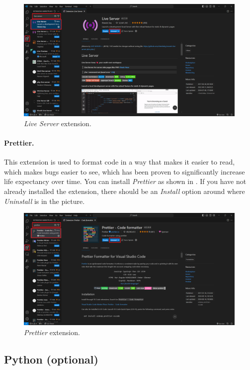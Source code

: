 \documentclass[a4paper,10pt]{article}
\begin{document}
\begin{figure}[htbp]
    \centering
    \includegraphics[width=\textwidth]{live_server.png}
    \caption{\emph{Live Server} extension.}
    \label{fig:live_server}   
\end{figure}

\paragraph{Prettier.} This extension is used to format code in a way that makes it easier to read, which makes bugs easier to see, which has been proven to significantly increase life expectancy over time. You can install \emph{Prettier} as shown in . If you have not already installed the extension, there should be an \emph{Install} option around where \emph{Uninstall} is in the picture.

\begin{figure}[htbp]
    \centering
    \includegraphics[width=\textwidth]{prettier.png}
    \caption{\emph{Prettier} extension.}
    \label{fig:prettier}   
\end{figure}

\subsection{Python (optional)}
\end{document}

